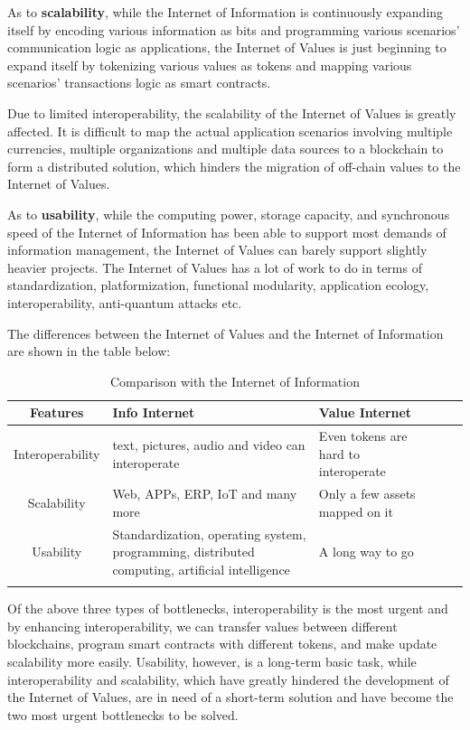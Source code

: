 \documentclass[a4paper,12pt]{article}
\begin{document}
As to \textbf{scalability}, while the Internet of Information is continuously expanding itself by encoding various information as bits and programming various scenarios' communication logic as applications, the Internet of Values is just beginning to expand itself by tokenizing various values as tokens and mapping various scenarios' transactions logic as smart contracts.

Due to limited interoperability, the scalability of the Internet of Values is greatly affected. It is difficult to map the actual application scenarios involving multiple currencies, multiple organizations and multiple data sources to a blockchain to form a distributed solution, which hinders the migration of off-chain values to the Internet of Values.

As to \textbf{usability}, while the computing power, storage capacity, and synchronous speed of the Internet of Information has been able to support most demands of information management, the Internet of Values can barely support slightly heavier projects. The Internet of Values has a lot of work to do in terms of standardization, platformization, functional modularity, application ecology, interoperability, anti-quantum attacks etc.

The differences between the Internet of Values and the Internet of Information are shown in the table below:

\begin{table}[!hpb]\small
  \caption{Comparison with the Internet of Information}
  \label{tbl:keyproblems}
  \centering
  \begin{tabular}{cp{}lp{}lp{}}
\\
\hline

Features & Info Internet & Value Internet \\
\hline
Interoperability & text, pictures, audio and video can interoperate & Even tokens are hard to interoperate \\
Scalability & Web, APPs, ERP, IoT and many more & Only a few assets mapped on it\\
Usability & Standardization, operating system, programming, distributed computing, artificial intelligence & A long way to go\\

\hline
\\
 \end {tabular}
\end {table}

Of the above three types of bottlenecks, interoperability is the most urgent and by enhancing interoperability, we can transfer values between different blockchains, program smart contracts with different tokens, and make update scalability more easily. Usability, however, is a long-term basic task, while interoperability and scalability, which have greatly hindered the development of the Internet of Values, are in need of a short-term solution and have become the two most urgent bottlenecks to be solved.
\end{document}
